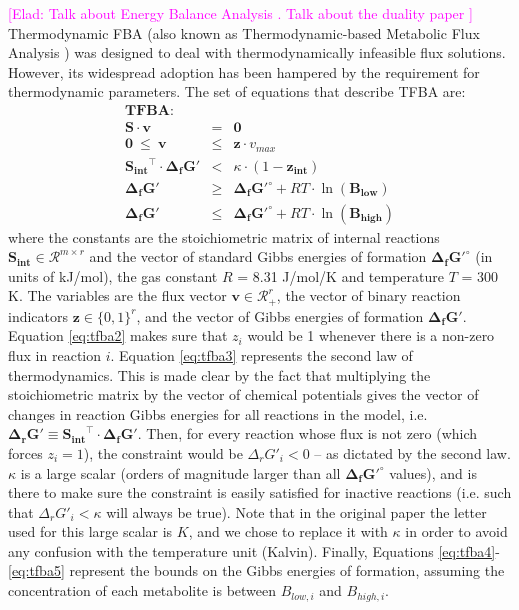 \documentclass[twocolumn]{bmcart}%
\newcommand{\elad}[1]{{\textcolor{magenta}{[Elad: {#1}]}}}
\newcommand{\Sint}{\mathbf{S_{int}}}
\begin{document}
\elad{Talk about Energy Balance Analysis \cite{Beard2002-xt}. Talk about the duality paper \cite{Warren2007-wm}}
Thermodynamic FBA (also known as Thermodynamic-based Metabolic Flux Analysis \cite{Henry2007-xp}) was designed to deal with thermodynamically infeasible flux solutions. However, its widespread adoption has been hampered by the requirement for thermodynamic parameters. The set of equations that describe TFBA are:
\begin{eqnarray}
\textbf{TFBA:~~} && \nonumber\\
\mathbf{S} \cdot \mathbf{v} &=& \mathbf{0}  \label{eq:tfba1} \\
\mathbf{0} ~\leq~ \mathbf{v} &\leq & \mathbf{z} \cdot v_{max} \label{eq:tfba2} \\
\Sint^\top \cdot \mathbf{\Delta_f G'} &<& \kappa \cdot (1-\mathbf{z_{int}}) \label{eq:tfba3} \\
\mathbf{\Delta_f G'}& \geq & \mathbf{\Delta_f G'^\circ} + RT \cdot \ln(\mathbf{B_{low}}) \label{eq:tfba4} \\
\mathbf{\Delta_f G'}& \leq & \mathbf{\Delta_f G'^\circ} + RT \cdot \ln(\mathbf{B_{high}}) \label{eq:tfba5}
\end{eqnarray}
where the constants are the stoichiometric matrix of internal reactions $\Sint \in \mathcal{R}^{m \times r}$  and the vector of standard Gibbs energies of formation $\mathbf{\Delta_f G'^\circ}$ (in units of kJ/mol), the gas constant $R$ = 8.31 J/mol/K and temperature $T$ = 300 K. The variables are the flux vector $\mathbf{v} \in \mathcal{R}_{+}^{r}$, the vector of binary reaction indicators $\mathbf{z} \in \{0,1\}^{r}$, and the vector of Gibbs energies of formation $\mathbf{\Delta_f G'}$. Equation \ref{eq:tfba2} makes sure that $z_i$ would be 1 whenever there is a non-zero flux in reaction $i$. Equation \ref{eq:tfba3} represents the second law of thermodynamics. This is made clear by the fact that multiplying the stoichiometric matrix by the vector of chemical potentials gives the vector of changes in reaction Gibbs energies for all reactions in the model, i.e. $\mathbf{\Delta_r G'} \equiv \Sint^\top \cdot \mathbf{\Delta_f G'}$. Then, for every reaction whose flux is not zero (which forces $z_i = 1$), the constraint would be $\Delta_r G'_i < 0$ -- as dictated by the second law. $\kappa$ is a large scalar (orders of magnitude larger than all $\mathbf{\Delta_f G'^\circ}$ values), and is there to make sure the constraint is easily satisfied for inactive reactions (i.e. such that $\Delta_r G'_i < \kappa$ will always be true). Note that in the original paper \cite{Henry2007-xp} the letter used for this large scalar is $K$, and we chose to replace it with $\kappa$ in order to avoid any confusion with the temperature unit (Kalvin).  Finally, Equations \ref{eq:tfba4}-\ref{eq:tfba5} represent the bounds on the Gibbs energies of formation, assuming the concentration of each metabolite is between $B_{low,i}$ and $B_{high,i}$.
\end{document}
